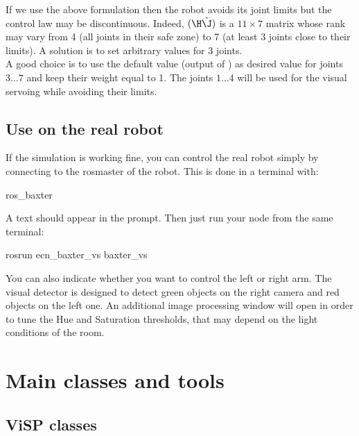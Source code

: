 \documentclass{ecnreport}
\begin{document}
If we use the above formulation then the robot avoids its joint limits but the control law may be discontinuous. Indeed, $(\H\tilde\J)$ is a $11\times 7$ matrix whose rank may vary from 4 (all joints in their safe zone) to 7 (at least 3 joints close to their limits). A solution is to set arbitrary values for 3 joints. \\

A good choice is to use the default value (output of ) as desired value for joints $3\hdots7$ and keep their weight equal to 1. 
The joints $1\hdots 4$ will be used for the visual servoing while avoiding their limits.

\subsection{Use on the real robot}

If the simulation is working fine, you can control the real robot simply by connecting to the rosmaster of the robot. This is done in a terminal with:
\begin{bashcodelarge}
 ros_baxter
\end{bashcodelarge}A \okttt{[baxter]} text should appear in the prompt.
Then just run your node from the same terminal:
\begin{bashcodelarge}
 rosrun ecn_baxter_vs baxter_vs
\end{bashcodelarge}

You can also indicate whether you want to control the left or right arm. The visual detector is designed to detect green objects on the right camera and red objects on the left one. An additional image processing window will open in order to tune the Hue and Saturation thresholds, that may depend on the light conditions of the room.\\



\appendix

\section{Main classes and tools}\label{sec:classes}

\subsection{ViSP classes}
\end{document}
